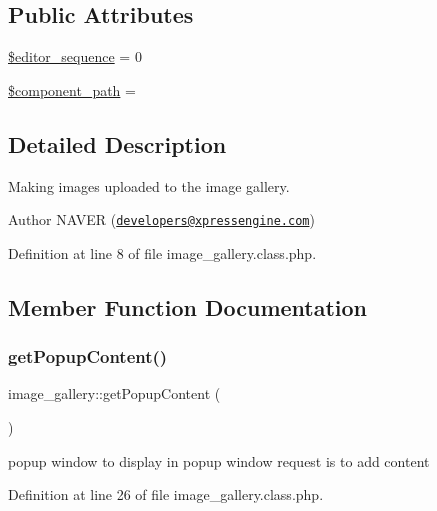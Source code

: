 \subsection*{Public Attributes}
\begin{DoxyCompactItemize}
\item 
\hyperlink{classimage__gallery_a63124b017697df694664efada4edd0be}{\$editor\+\_\+sequence} = 0
\item 
\hyperlink{classimage__gallery_a1ace79c095079e133d5f98625d89460e}{\$component\+\_\+path} = \textquotesingle{}\textquotesingle{}
\end{DoxyCompactItemize}


\subsection{Detailed Description}
Making images uploaded to the image gallery. 

\begin{DoxyAuthor}{Author}
N\+A\+V\+ER (\href{mailto:developers@xpressengine.com}{\tt developers@xpressengine.\+com}) 
\end{DoxyAuthor}


Definition at line 8 of file image\+\_\+gallery.\+class.\+php.



\subsection{Member Function Documentation}
\hypertarget{classimage__gallery_a71ee76734048f188f3ec9caf692609b0}{}\label{classimage__gallery_a71ee76734048f188f3ec9caf692609b0} 
\subsubsection{\texorpdfstring{get\+Popup\+Content()}{getPopupContent()}}
{\footnotesize\ttfamily image\+\_\+gallery\+::get\+Popup\+Content (\begin{DoxyParamCaption}{ }\end{DoxyParamCaption})}



popup window to display in popup window request is to add content 



Definition at line 26 of file image\+\_\+gallery.\+class.\+php.

